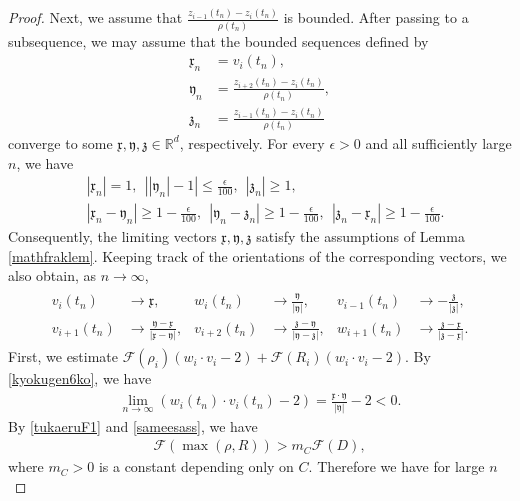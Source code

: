 \documentclass[10pt,a4paper]{amsart}
\numberwithin{equation}{section}
\begin{document}
\begin{proof}
Next, we assume that $\frac{z_{i-1}(t_n)-z_i(t_n)}{\rho(t_n)}$ is bounded. After passing to a subsequence, we may assume that the bounded sequences defined by
\begin{align*}
\mathfrak{x}_n&=v_i(t_n),
\\
\mathfrak{y}_n&=
\frac{z_{i+2}(t_n)-z_i(t_n)}{\rho(t_n)},
\\
\mathfrak{z}_n&=
\frac{z_{i-1}(t_n)-z_i(t_n)}{\rho(t_n)}
\end{align*}
converge to some $\mathfrak{x},\mathfrak{y},\mathfrak{z}\in\mathbb{R}^d$, respectively. For every $\epsilon>0$ and all sufficiently large $n$, we have
\begin{align*}
&|\mathfrak{x}_n|=1,\ \ \left||\mathfrak{y}_n|-1\right|
\leq\frac{\epsilon}{100},\ \ |\mathfrak{z}_n|\geq1,
\\
&|\mathfrak{x}_n-\mathfrak{y}_n|\geq1-\frac{\epsilon}{100},\ \ |\mathfrak{y}_n-\mathfrak{z}_n|\geq1-\frac{\epsilon}{100},\ \ |\mathfrak{z}_n-\mathfrak{x}_n|\geq1-\frac{\epsilon}{100}.
\end{align*}
Consequently, the limiting vectors
$\mathfrak{x},\mathfrak{y},\mathfrak{z}$
satisfy the assumptions of Lemma \ref{mathfraklem}. Keeping track of the orientations of the corresponding vectors, we also obtain, as $n\to\infty$,
\begin{align}\label{kyokugen6ko}
\begin{aligned}
v_i(t_n)
&\to\mathfrak{x},
&
w_i(t_n)
&\to\frac{\mathfrak{y}}{|\mathfrak{y}|},
&
v_{i-1}(t_n)
&\to-\frac{\mathfrak{z}}{|\mathfrak{z}|},
\\
v_{i+1}(t_n)
&\to
\frac{\mathfrak{y}-\mathfrak{x}}
{|\mathfrak{x}-\mathfrak{y}|},
&
v_{i+2}(t_n)
&\to
\frac{\mathfrak{z}-\mathfrak{y}}
{|\mathfrak{y}-\mathfrak{z}|},
&
w_{i+1}(t_n)
&\to
\frac{\mathfrak{z}-\mathfrak{x}}
{|\mathfrak{z}-\mathfrak{x}|}.
\end{aligned}
\end{align}
First, we estimate $\mathcal{F}(\rho_i)(w_i\cdot v_i-2)+\mathcal{F}(R_i)(w_i\cdot v_i-2)$. By \eqref{kyokugen6ko}, we have
\begin{align*}
\lim_{n\to\infty}(w_i(t_n)\cdot v_i(t_n)-2)=\frac{\mathfrak{x}\cdot \mathfrak{y}}{|\mathfrak{y}|}-2<0.
\end{align*}
By \eqref{tukaeruF1} and \eqref{sameesass}, we have
\begin{align*}
\mathcal{F}(\max{(\rho,R)})>m_C\mathcal{F}(D),
\end{align*}
where $m_C>0$ is a constant depending only on $C$. Therefore we have for large $n$

\end{proof}
\end{document}

